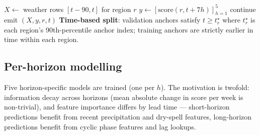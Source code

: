 \documentclass[conference,10pt,a4paper]{IEEEtran}
\begin{document}
\begin{algorithm}
\caption{Leakage-safe 91-day window construction}
\label{alg:windows}
\begin{algorithmic}[1]
    \State $X \gets$ weather rows $[t{-}90, t]$ for region $r$
    \State $y \gets [\mathrm{score}(r,t{+}7h)]_{h=1}^{5}$
     \State continue \EndIf
    \State emit $(X, y, r, t)$
  \EndFor
\EndFor
\State \textbf{Time-based split}: validation anchors satisfy $t \ge t^{\star}_{r}$ where $t^{\star}_{r}$ is each region's 90th-percentile anchor index; training anchors are strictly earlier in time within each region.
\end{algorithmic}
\end{algorithm}

\subsection{Per-horizon modelling}
Five horizon-specific models are trained (one per $h$). The motivation is twofold: information decay across horizons (mean absolute change in score per week is non-trivial), and feature importance differs by lead time --- short-horizon predictions benefit from recent precipitation and dry-spell features, long-horizon predictions benefit from cyclic phase features and lag lookups.
\end{document}
